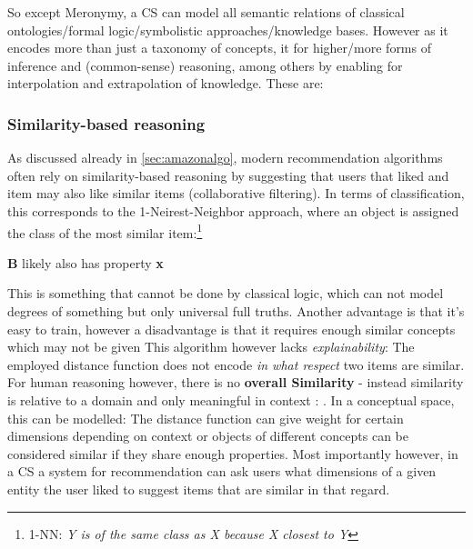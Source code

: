 So except Meronymy, a CS can model all semantic relations of classical ontologies/formal logic/symbolistic approaches/knowledge bases. However as it encodes more than just a taxonomy of concepts, it for higher/more forms of inference and (common-sense) reasoning, among others by enabling for interpolation and extrapolation of knowledge. These are:

\subsubsection*{Similarity-based reasoning}

\label{sec:similaritybasedreasoning}

As discussed already in \autoref{sec:amazonalgo}, modern recommendation algorithms often rely on similarity-based reasoning by suggesting that users that liked and item may also like similar items (collaborative filtering). In terms of classification, this corresponds to the 1-Neirest-Neighbor approach, where an object is assigned the class of the most similar item:\footnote{1-NN: \textit{Y is of the same class as X because X closest to Y}}

\noindent
\begin{minipage}{.6\textwidth}
\end{minipage}%
\begin{minipage}{.4\textwidth}
             {\textbf{B} likely also has property \textbf{x}}
\end{minipage}%

\vspace{2ex}

This is something that cannot be done by classical logic, which can not model degrees of something but only universal full truths. Another advantage is that it's easy to train, however a disadvantage is that it requires enough similar concepts which may not be given This algorithm however lacks \textit{explainability}: The employed distance function does not encode \textit{in what respect} two items are similar. For human reasoning however, there is no \textbf{overall Similarity} - instead similarity is relative to a domain and only meaningful in context \cite{Goodman1972-GOOPAP-3}:  \cite[110]{Gardenfors2000a}. In a conceptual space, this can be modelled: The distance function can give weight for certain dimensions depending on context or objects of different concepts can be considered similar if they share enough properties. Most importantly however, in a CS a system for recommendation can ask users what dimensions of a given entity the user liked to suggest items that are similar in that regard.

